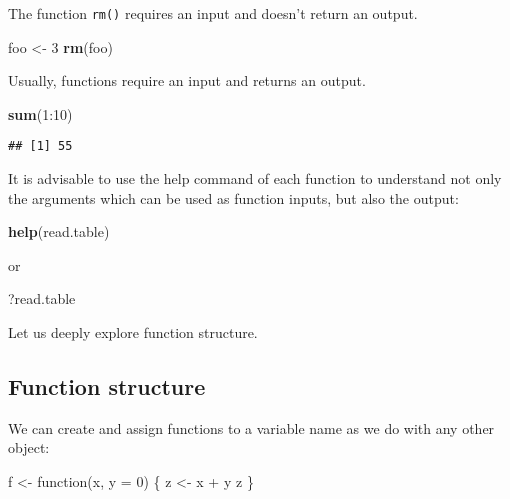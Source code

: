 \documentclass[]{book}
\newenvironment{Shaded}{\begin{snugshade}}{\end{snugshade}}
\newcommand{\KeywordTok}[1]{\textcolor[rgb]{0.13,0.29,0.53}{\textbf{{#1}}}}
\newcommand{\DataTypeTok}[1]{\textcolor[rgb]{0.13,0.29,0.53}{{#1}}}
\newcommand{\DecValTok}[1]{\textcolor[rgb]{0.00,0.00,0.81}{{#1}}}
\newcommand{\StringTok}[1]{\textcolor[rgb]{0.31,0.60,0.02}{{#1}}}
\newcommand{\NormalTok}[1]{{#1}}
\begin{document}
The function \texttt{rm()} requires an input and doesn't return an
output.

\begin{Shaded}
\begin{Highlighting}[]
\NormalTok{foo <-}\StringTok{ }\DecValTok{3}
\KeywordTok{rm}\NormalTok{(foo)}
\end{Highlighting}
\end{Shaded}

Usually, functions require an input and returns an output.

\begin{Shaded}
\begin{Highlighting}[]
\KeywordTok{sum}\NormalTok{(}\DecValTok{1}\NormalTok{:}\DecValTok{10}\NormalTok{)}
\end{Highlighting}
\end{Shaded}

\begin{verbatim}
## [1] 55
\end{verbatim}

It is advisable to use the help command of each function to understand
not only the arguments which can be used as function inputs, but also
the output:

\begin{Shaded}
\begin{Highlighting}[]
\KeywordTok{help}\NormalTok{(read.table)}
\end{Highlighting}
\end{Shaded}

or

\begin{Shaded}
\begin{Highlighting}[]
\NormalTok{?read.table}
\end{Highlighting}
\end{Shaded}

Let us deeply explore function structure.

\subsection{Function structure}\label{function-structure}

We can create and assign functions to a variable name as we do with any
other object:

\begin{Shaded}
\begin{Highlighting}[]
\NormalTok{f <-}\StringTok{ }\NormalTok{function(x, }\DataTypeTok{y =} \DecValTok{0}\NormalTok{) \{}
  \NormalTok{z <-}\StringTok{ }\NormalTok{x +}\StringTok{ }\NormalTok{y}
  \NormalTok{z}
\NormalTok{\}}
\end{Highlighting}
\end{Shaded}
\end{document}
